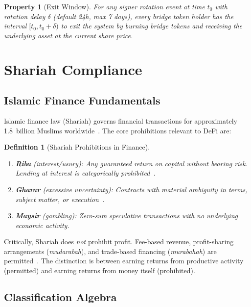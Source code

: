 \documentclass[11pt,twocolumn]{article}
\newtheorem{definition}[theorem]{Definition}
\newtheorem{property}[theorem]{Property}
\theoremstyle{definition}
\begin{document}
\begin{property}[Exit Window]
\label{prop:exit}
For any signer rotation event at time $t_0$ with rotation delay $\delta$ (default 24h, max 7 days), every bridge token holder has the interval $[t_0, t_0 + \delta)$ to exit the system by burning bridge tokens and receiving the underlying asset at the current share price.
\end{property}

\section{Shariah Compliance}
\label{sec:shariah}

\subsection{Islamic Finance Fundamentals}

Islamic finance law (Shariah) governs financial transactions for approximately 1.8~billion Muslims worldwide~\cite{usmani2002}. The core prohibitions relevant to DeFi are:

\begin{definition}[Shariah Prohibitions in Finance]
\label{def:prohibitions}
\begin{enumerate}[nosep]
  \item \textbf{Riba} (interest/usury): Any guaranteed return on capital without bearing risk. Lending at interest is categorically prohibited~\cite{iqbal2011}.
  \item \textbf{Gharar} (excessive uncertainty): Contracts with material ambiguity in terms, subject matter, or execution~\cite{elgari2003}.
  \item \textbf{Maysir} (gambling): Zero-sum speculative transactions with no underlying economic activity.
\end{enumerate}
\end{definition}

Critically, Shariah does \emph{not} prohibit profit. Fee-based revenue, profit-sharing arrangements (\emph{mudarabah}), and trade-based financing (\emph{murabahah}) are permitted~\cite{usmani2002}. The distinction is between earning returns from productive activity (permitted) and earning returns from money itself (prohibited).

\subsection{Classification Algebra}
\end{document}

